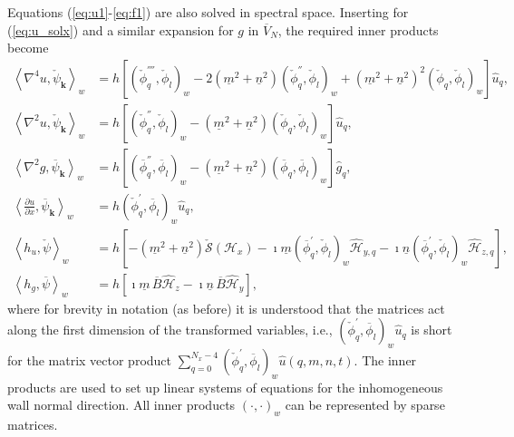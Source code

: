 \documentclass[11pt, oneside]{article}
\newcommand{\N}[1]{\check{#1}}
\newcommand{\D}[1]{\overline{#1}}
\begin{document}
Equations (\ref{eq:u1}-\ref{eq:f1}) are also solved in spectral space. 
Inserting for (\ref{eq:u_solx}) and a similar expansion for $g$ in $\D{V}_N$, 
the required inner products become
\begin{align}
\left<\nabla^4u, \N{\psi}_{\bm{k}}\right>_w &= h\left[ \left( 
\N{\phi}_q^{''''}, 
\N{\phi}_l\right)_w -2(\underline{m}^2+\underline{n}^2) \left( \N{\phi}_q^{''}, 
\N{\phi}_l\right)_w + (\underline{m}^2+\underline{n}^2)^2\left( \N{\phi}_q, 
\N{\phi}_l\right)_w  \right] \hat{u}_q, \\
\left< \nabla^2 u, \N{\psi}_{\bm{k}}\right>_w &= h\left[\left( \N{\phi}_q^{''}, 
\N{\phi}_l\right)_w - (\underline{m}^2+\underline{n}^2)\left( \N{\phi}_q, 
\N{\phi}_l \right)_w \right] \hat{u}_q, \\
\left< \nabla^2 g, \D{\psi}_{\bm{k}}\right>_w &= h\left[\left( \D{\phi}_q^{''}, 
\D{\phi}_l\right)_w - (\underline{m}^2+\underline{n}^2)\left( \D{\phi}_q, 
\D{\phi}_l \right)_w \right] \hat{g}_q, \\
\left<\frac{\partial u}{\partial x}, \D{\psi}_{\bm{k}}\right>_w &=
h\left(\N{\phi}_q^{'}, \D{\phi}_l\right)_w \hat{u}_q, \\
\left<h_u, \N{\psi} \right>_w &= h\left[-(\underline{m}^2+\underline{n}^2) 
\N{\mathcal{S}}(\mathcal{H}_x) - \imath \underline{m}\left(\D{\phi}_q^{'}, 
\N{\phi}_l \right)_w \hat{\mathcal{H}}_{y, q} - \imath 
\underline{n}\left(\D{\phi}_q^{'}, \N{\phi}_l \right)_w 
\hat{\mathcal{H}}_{z, q}\right], 
\\
\left< h_g, \D{\psi} \right>_w &= h\left[ \imath \underline{m}\, \D{B} 
\hat{\mathcal{H}}_z - \imath \underline{n}\, \D{B} \hat{\mathcal{H}}_{y} 
\right],
\end{align}
where for brevity in notation (as before) it is understood that the matrices 
act along the first dimension of the transformed variables, i.e.,  $ 
\left(\N{\phi}_q^{'}, \D{\phi}_l\right)_w \hat{u}_q$ is short for the matrix 
vector product $ \sum_{q=0}^{N_x-4}\left( \N{\phi}_q^{'}, \D{\phi}_l\right)_w 
\hat{u}(q, {m}, {n}, t)$. The inner products are used to set up linear systems 
of equations for the inhomogeneous wall normal direction. All inner products 
$\left(\cdot, \cdot\right)_w$ can be represented by sparse matrices.
\end{document}
